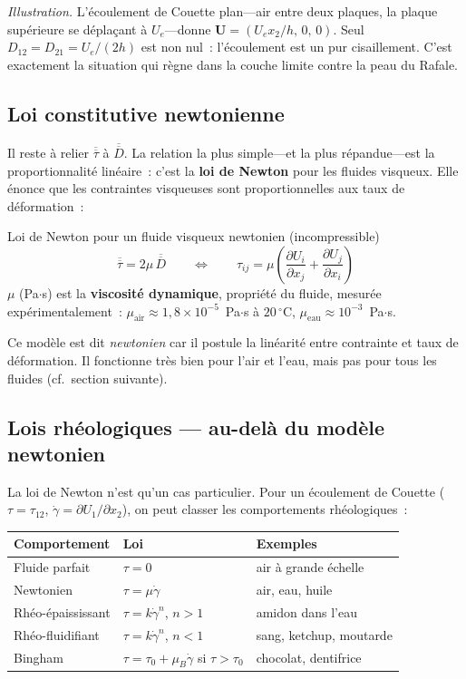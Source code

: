 \documentclass[11pt,a4paper]{report}
\newcommand{\pd}[2]{\dfrac{\partial #1}{\partial #2}}
\newcommand{\ten}[1]{\overline{\overline{#1}}}   %
\begin{document}
\textit{Illustration.} L'écoulement de Couette plan---air entre deux plaques, la
plaque supérieure se déplaçant à $U_e$---donne $\bm{U} = (U_e x_2/h,\,0,\,0)$.
Seul $D_{12}=D_{21}=U_e/(2h)$ est non nul~: l'écoulement est un pur cisaillement.
C'est exactement la situation qui règne dans la couche limite contre la peau du Rafale.

\subsection{Loi constitutive newtonienne}

Il reste à relier $\ten{\tau}$ à $\ten{D}$. La relation la plus simple---et la plus
répandue---est la proportionnalité linéaire~: c'est la \textbf{loi de Newton} pour les
fluides visqueux. Elle énonce que les contraintes visqueuses sont proportionnelles aux
taux de déformation~:

\begin{importantbox}{Loi de Newton pour un fluide visqueux newtonien (incompressible)}
\[
    \ten{\tau} = 2\mu\,\ten{D}
    \qquad\Longleftrightarrow\qquad
    \tau_{ij} = \mu\left(\pd{U_i}{x_j} + \pd{U_j}{x_i}\right)
\]
$\mu$ (Pa$\cdot$s) est la \textbf{viscosité dynamique}, propriété du fluide, mesurée
expérimentalement~: $\mu_\text{air}\approx 1{,}8\times10^{-5}$~Pa$\cdot$s à $20\,^{\circ}$C,
$\mu_\text{eau}\approx 10^{-3}$~Pa$\cdot$s.
\end{importantbox}

Ce modèle est dit \emph{newtonien} car il postule la linéarité entre contrainte et taux
de déformation. Il fonctionne très bien pour l'air et l'eau, mais pas pour tous les
fluides (cf.\ section suivante).

\subsection{Lois rhéologiques --- au-delà du modèle newtonien}

La loi de Newton n'est qu'un cas particulier. Pour un écoulement de Couette
($\tau = \tau_{12}$, $\dot{\gamma}=\partial U_1/\partial x_2$), on peut classer les
comportements rhéologiques~:

\begin{center}
\renewcommand{\arraystretch}{1.4}
\begin{tabular}{lll}
\toprule
\textbf{Comportement} & \textbf{Loi} & \textbf{Exemples} \\
\midrule
Fluide parfait & $\tau=0$ & air à grande échelle \\
Newtonien & $\tau=\mu\dot{\gamma}$ & air, eau, huile \\
Rhéo-épaississant & $\tau=k\dot{\gamma}^n$, $n>1$ & amidon dans l'eau \\
Rhéo-fluidifiant & $\tau=k\dot{\gamma}^n$, $n<1$ & sang, ketchup, moutarde \\
Bingham & $\tau=\tau_0+\mu_B\dot{\gamma}$ si $\tau>\tau_0$ & chocolat, dentifrice \\
\bottomrule
\end{tabular}
\end{center}
\end{document}
